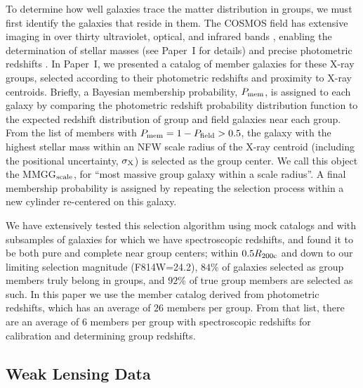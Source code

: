 \documentclass[12pt]{emulateapj}
\begin{document}
To determine how well galaxies trace the matter distribution in
groups, we must first identify the galaxies that reside in them. The
COSMOS field has extensive imaging in over thirty ultraviolet,
optical, and infrared bands \citep{Capak2007b}, enabling the
determination of stellar masses (see Paper~I for details) and precise
photometric redshifts \citep[][and Paper~I for further
tests]{Ilbert2009}. In Paper~I, we presented a catalog of member
galaxies for these X-ray groups, selected according to their
photometric redshifts and proximity to X-ray centroids. Briefly, a
Bayesian membership probability, $P_{\rm mem}$, is assigned to each
galaxy by comparing the photometric redshift probability distribution
function to the expected redshift distribution of group and field
galaxies near each group. From the list of members with $P_{\rm mem}=1-P_{\rm
  field}>0.5$, the galaxy with the highest stellar mass within an NFW
scale radius of the X-ray centroid (including the positional
uncertainty, $\sigma_{\rm X}$) is selected as the group center. We
call this object the MMGG$_{\rm scale}$, for ``most massive group galaxy
within a scale radius''. A final membership probability is assigned by
repeating the selection process within a new cylinder re-centered on
this galaxy.

We have extensively tested this selection algorithm using mock
catalogs and with subsamples of galaxies for which we have
spectroscopic redshifts, and found it to be both pure and complete
near group centers; within $0.5 R_{\rm 200c}$ and down to our limiting
selection magnitude (F814W=24.2), $84\%$ of galaxies selected as group
members truly belong in groups, and $92\%$ of true group members are
selected as such. In this paper we use the member catalog derived from
photometric redshifts, which has an average of $26$ members per
group. From that list, there are an average of $6$ members per group
with spectroscopic redshifts for calibration and determining group
redshifts.

\subsection{Weak Lensing Data}
\end{document}
